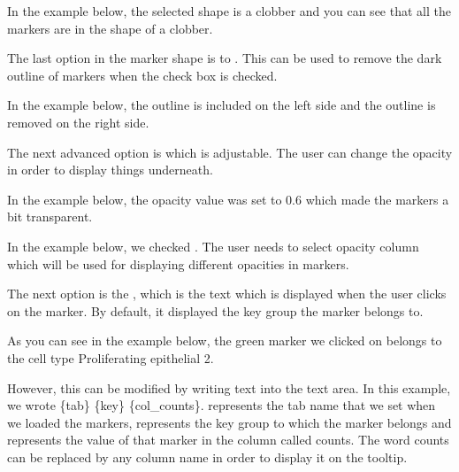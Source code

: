 \documentclass[letterpaper,10pt,english,openany,oneside]{sphinxmanual}
\begin{document}
\sphinxAtStartPar
{}

\sphinxAtStartPar
In the example below, the selected shape is a clobber and you can see that all the markers are in the shape of a clobber.

\sphinxAtStartPar
{}

\sphinxAtStartPar
The last option in the marker shape is to . This can be used to remove the dark outline of markers when the check box is checked.

\sphinxAtStartPar
{}

\sphinxAtStartPar
In the example below, the outline is included on the left side and the outline is removed on the right side.

\sphinxAtStartPar
{}

\sphinxAtStartPar
The next advanced option is  which is adjustable. The user can change the opacity in order to display things underneath.

\sphinxAtStartPar
{}

\sphinxAtStartPar
In the example below, the opacity value was set to 0.6 which made the markers a bit transparent.

\sphinxAtStartPar
{}

\sphinxAtStartPar
In the example below, we checked . The user needs to select opacity column which will be used for displaying different opacities in markers.

\sphinxAtStartPar
{}

\sphinxAtStartPar
The next option is the , which is the text which is displayed when the user clicks on the marker. By default, it displayed the key group the marker belongs to.

\sphinxAtStartPar
{}

\sphinxAtStartPar
As you can see in the example below, the green marker we clicked on belongs to the cell type Proliferating epithelial 2.

\sphinxAtStartPar
{}

\sphinxAtStartPar
However, this can be modified by writing text into the text area. In this example, we wrote \{tab\} \sphinxhyphen{} \{key\} \sphinxhyphen{} \{col\_counts\}.  represents the tab name that we set when we loaded the markers,  represents the key group to which the marker belongs and  represents the value of that marker in the column called counts. The word counts can be replaced by any column name in order to display it on the tooltip.
\end{document}
